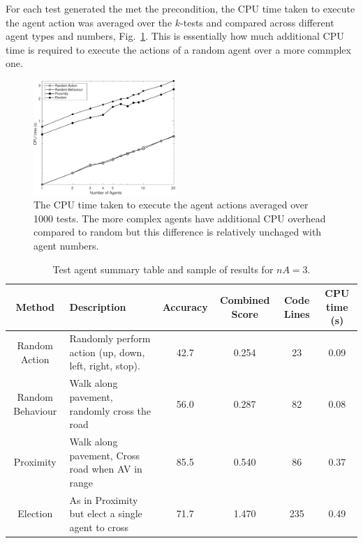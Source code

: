 \documentclass[letterpaper, 10 pt, journal, twoside]{IEEEtran}
\begin{document}
For each test generated the met the precondition, the CPU time taken to execute the agent action was averaged over the $k$-tests and compared across different agent types and numbers, Fig.~\ref{CPUTime}. This is essentially how much additional CPU time is required to execute the actions of a random agent over a more commplex one.

\begin{figure}[!t]
	\centering
\includegraphics[width=0.48\textwidth]{TimeCPU_log.pdf}
	\caption{The CPU time taken to execute the agent actions averaged over 1000 tests. The more complex agents have additional CPU overhead compared to random but this difference is relatively unchaged with agent numbers.}
	\label{CPUTime}
\end{figure}


\begin{table}
\centering
\caption{Test agent summary table and sample of results for $nA=3$.}
\label{ResultsTable}
\begin{tabular}{|c||p{7cm}|c|c|c|c|}
\hline
Method & Description & Accuracy & Combined Score & Code Lines & CPU time (s) \\
\hline
Random Action & Randomly perform action (up, down, left, right, stop). & 42.7 & 0.254 & 23& 0.09 \\
Random Behaviour & Walk along pavement, randomly cross the road & 56.0 & 0.287 & 82& 0.08 \\
Proximity & Walk along pavement, Cross road when AV in range & 85.5 & 0.540 & 86& 0.37 \\
Election & As in Proximity but elect a single agent to cross & 71.7 & 1.470 & 235&0.49\\
\hline 
\end{tabular}
\end{table}
\end{document}
